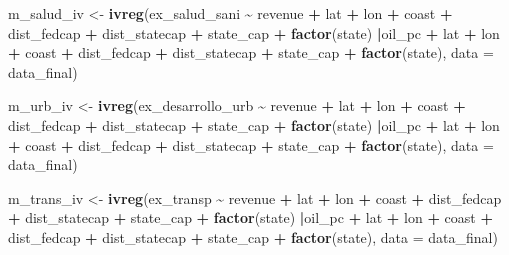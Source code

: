 \documentclass[
]{article}
\newenvironment{Shaded}{\begin{snugshade}}{\end{snugshade}}
\newcommand{\AttributeTok}[1]{\textcolor[rgb]{0.13,0.29,0.53}{#1}}
\newcommand{\FunctionTok}[1]{\textcolor[rgb]{0.13,0.29,0.53}{\textbf{#1}}}
\newcommand{\NormalTok}[1]{#1}
\newcommand{\OtherTok}[1]{\textcolor[rgb]{0.56,0.35,0.01}{#1}}
\newcommand{\SpecialCharTok}[1]{\textcolor[rgb]{0.81,0.36,0.00}{\textbf{#1}}}
\begin{document}
\begin{Shaded}
\begin{Highlighting}[]
\NormalTok{m\_salud\_iv }\OtherTok{\textless{}{-}} \FunctionTok{ivreg}\NormalTok{(ex\_salud\_sani }\SpecialCharTok{\textasciitilde{}}\NormalTok{ revenue }\SpecialCharTok{+}\NormalTok{ lat }\SpecialCharTok{+}\NormalTok{ lon }\SpecialCharTok{+}\NormalTok{ coast }\SpecialCharTok{+}\NormalTok{ dist\_fedcap }\SpecialCharTok{+}\NormalTok{ dist\_statecap }\SpecialCharTok{+}\NormalTok{ state\_cap }\SpecialCharTok{+} \FunctionTok{factor}\NormalTok{(state) }\SpecialCharTok{|}\NormalTok{oil\_pc }\SpecialCharTok{+}\NormalTok{ lat }\SpecialCharTok{+}\NormalTok{ lon }\SpecialCharTok{+}\NormalTok{ coast }\SpecialCharTok{+}\NormalTok{ dist\_fedcap }\SpecialCharTok{+}\NormalTok{ dist\_statecap }\SpecialCharTok{+}\NormalTok{ state\_cap }\SpecialCharTok{+} \FunctionTok{factor}\NormalTok{(state), }\AttributeTok{data =}\NormalTok{ data\_final)}

\NormalTok{m\_urb\_iv  }\OtherTok{\textless{}{-}} \FunctionTok{ivreg}\NormalTok{(ex\_desarrollo\_urb }\SpecialCharTok{\textasciitilde{}}\NormalTok{ revenue }\SpecialCharTok{+}\NormalTok{ lat }\SpecialCharTok{+}\NormalTok{ lon }\SpecialCharTok{+}\NormalTok{ coast }\SpecialCharTok{+}\NormalTok{ dist\_fedcap }\SpecialCharTok{+}\NormalTok{ dist\_statecap }\SpecialCharTok{+}\NormalTok{ state\_cap }\SpecialCharTok{+} \FunctionTok{factor}\NormalTok{(state) }\SpecialCharTok{|}\NormalTok{oil\_pc }\SpecialCharTok{+}\NormalTok{ lat }\SpecialCharTok{+}\NormalTok{ lon }\SpecialCharTok{+}\NormalTok{ coast }\SpecialCharTok{+}\NormalTok{ dist\_fedcap }\SpecialCharTok{+}\NormalTok{ dist\_statecap }\SpecialCharTok{+}\NormalTok{ state\_cap }\SpecialCharTok{+} \FunctionTok{factor}\NormalTok{(state), }\AttributeTok{data =}\NormalTok{ data\_final)}

\NormalTok{m\_trans\_iv }\OtherTok{\textless{}{-}} \FunctionTok{ivreg}\NormalTok{(ex\_transp }\SpecialCharTok{\textasciitilde{}}\NormalTok{ revenue }\SpecialCharTok{+}\NormalTok{ lat }\SpecialCharTok{+}\NormalTok{ lon }\SpecialCharTok{+}\NormalTok{ coast }\SpecialCharTok{+}\NormalTok{ dist\_fedcap }\SpecialCharTok{+}\NormalTok{ dist\_statecap }\SpecialCharTok{+}\NormalTok{ state\_cap }\SpecialCharTok{+} \FunctionTok{factor}\NormalTok{(state) }\SpecialCharTok{|}\NormalTok{oil\_pc }\SpecialCharTok{+}\NormalTok{ lat }\SpecialCharTok{+}\NormalTok{ lon }\SpecialCharTok{+}\NormalTok{ coast }\SpecialCharTok{+}\NormalTok{ dist\_fedcap }\SpecialCharTok{+}\NormalTok{ dist\_statecap }\SpecialCharTok{+}\NormalTok{ state\_cap }\SpecialCharTok{+} \FunctionTok{factor}\NormalTok{(state), }\AttributeTok{data =}\NormalTok{ data\_final)}


\end{Highlighting}
\end{Shaded}
\end{document}
